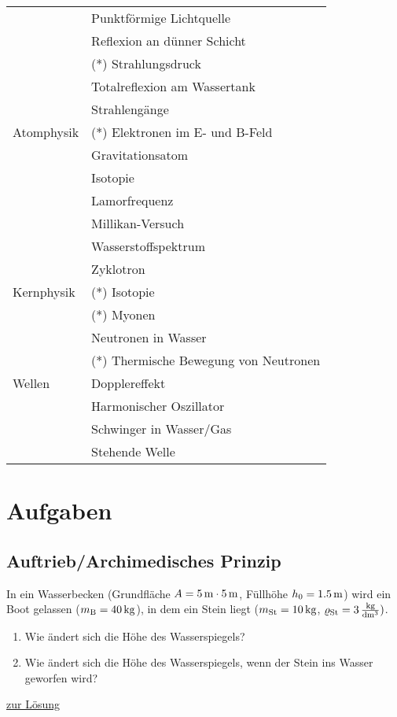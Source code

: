 \documentclass[a4paper]{scrartcl}
\begin{document}
\begin{longtable}{ll}
  & Punktförmige Lichtquelle \\
  & Reflexion an dünner Schicht \\
  & (*) Strahlungsdruck \\
  & Totalreflexion am Wassertank\\
  & Strahlengänge\\
  Atomphysik & (*) Elektronen im E- und B-Feld\\
  & Gravitationsatom \\
  & Isotopie \\
  & Lamorfrequenz \\
  & Millikan-Versuch \\
  & Wasserstoffspektrum \\
  & Zyklotron\\
  Kernphysik & (*) Isotopie \\
  & (*) Myonen\\
  & Neutronen in Wasser \\
  & (*) Thermische Bewegung von Neutronen\\
  Wellen & Dopplereffekt \\
  & Harmonischer Oszillator \\
  & Schwinger in Wasser/Gas\\
  & Stehende Welle\\
\end{longtable}

\section{Aufgaben}

\subsection{Auftrieb/Archimedisches Prinzip}
\label{aufg:Auftrieb}
In ein Wasserbecken (Grundfläche $A = \unit[5]{m} \cdot \unit[5]{m}$, Füllhöhe $h_0 = \unit[1.5]{m}$) wird ein Boot gelassen ($m_\text{B} = \unit[40]{kg}$), in dem ein Stein liegt ($m_\text{St} = \unit[10]{kg}$, $\varrho_\text{St} = \unit[3]{\frac{kg}{dm^3}})$.

\begin{enumerate}[noitemsep]
  \item Wie ändert sich die Höhe des Wasserspiegels?
  \item Wie ändert sich die Höhe des Wasserspiegels, wenn der Stein ins Wasser geworfen wird?
\end{enumerate}

\hyperref[lsg:Auftrieb]{zur Lösung}
\end{document}
